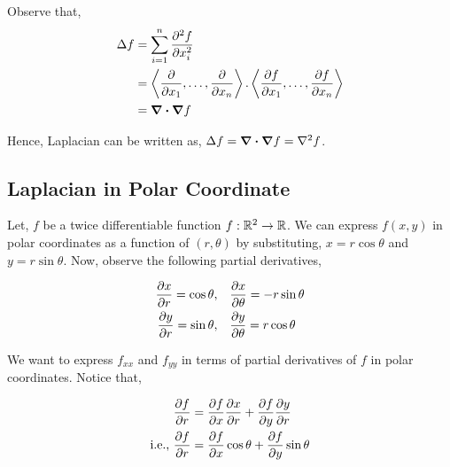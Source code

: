 \documentclass[../Analysis-3.tex]{subfiles}
\begin{document}
Observe that,  \begin{align*}
    \Delta f
     & = \sum_{i=1}^{n} \pdv[2]{f}{x_i}                                                                                               \\
     & = \left\langle \pdv{}{x_1}, \ldots, \pdv{}{x_n}  \right\rangle. \left\langle \pdv{f}{x_1}, \ldots, \pdv{f}{x_n}  \right\rangle \\
     & = \div\grad f
\end{align*}

Hence, Laplacian can be written as, $\Delta f = \div\grad f = \laplacian f$.

\subsection*{Laplacian in Polar Coordinate}

Let, $f$ be a twice differentiable function $f: \mathbb{R}^2 \to \mathbb{R}$. We can express $f(x, y)$ in polar coordinates as a function of $(r, \theta)$ by substituting, $x = r\cos{\theta}$ and $y= r\sin{\theta}$. Now, observe the following partial derivatives,

\begin{align*}
    \pdv{x}{r} = \cos{\theta}, \quad & \pdv{x}{\theta} = -r\sin{\theta} \\
    \pdv{y}{r} = \sin{\theta}, \quad & \pdv{y}{\theta} = r\cos{\theta}
\end{align*}

We want to express $f_{xx}$ and $f_{yy}$ in terms of partial derivatives of $f$ in polar coordinates. Notice that,

\begin{align*}
                  & \pdv{f}{r} = \pdv{f}{x} \pdv{x}{r} + \pdv{f}{y}\pdv{y}{r}     \\
    \text{i.e., } & \pdv{f}{r} = \pdv{f}{x} \cos{\theta} + \pdv{f}{y}\sin{\theta}
\end{align*}
\end{document}
